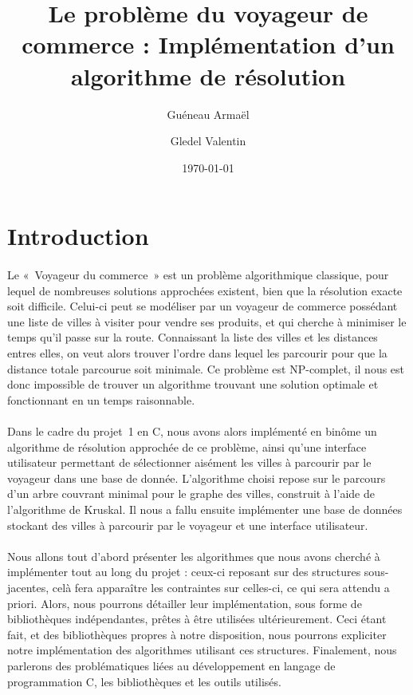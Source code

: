 \documentclass[a4paper]{article}
\title{Le problème du voyageur de commerce : Implémentation d'un algorithme de résolution}
\author{Guéneau Armaël \and Gledel Valentin}
\date{\today}
\begin{document}
\maketitle

\tableofcontents

\newpage

\section*{Introduction}

\paragraph*{}
Le «~Voyageur du commerce~» est un problème algorithmique classique, pour lequel de nombreuses solutions approchées existent, bien que la résolution exacte soit difficile. Celui-ci peut se modéliser par un voyageur de commerce possédant une liste de villes à visiter pour vendre ses produits, et qui cherche à minimiser le temps qu’il passe sur la route. Connaissant la liste des villes et les distances entres elles, on veut alors trouver l’ordre dans lequel les parcourir pour que la distance totale parcourue soit minimale. Ce problème est NP-complet, il nous est donc impossible de trouver un algorithme trouvant une solution optimale et fonctionnant en un temps raisonnable.
\paragraph*{}
Dans le cadre du projet~1 en C, nous avons alors implémenté en binôme un algorithme de résolution approchée de ce problème, ainsi qu’une interface utilisateur permettant de sélectionner aisément les villes à parcourir par le voyageur dans une base de donnée.
L’algorithme choisi repose sur le parcours d'un arbre couvrant minimal pour le graphe des villes, construit à l'aide de l'algorithme de Kruskal. Il nous a fallu ensuite implémenter une base de données stockant des villes à parcourir par le voyageur et une interface utilisateur.
\paragraph*{}
Nous allons tout d’abord présenter les algorithmes que nous avons cherché à implémenter tout au long du projet : ceux-ci reposant sur des structures sous-jacentes, celà fera apparaître les contraintes sur celles-ci, ce qui sera attendu a priori. Alors, nous pourrons détailler leur implémentation, sous forme de bibliothèques indépendantes, prêtes à être utilisées ultérieurement. Ceci étant fait, et des bibliothèques propres à notre disposition, nous pourrons expliciter notre implémentation des algorithmes utilisant ces structures. Finalement, nous parlerons des problématiques liées au développement en langage de programmation C, les bibliothèques et les outils utilisés.
\end{document}
